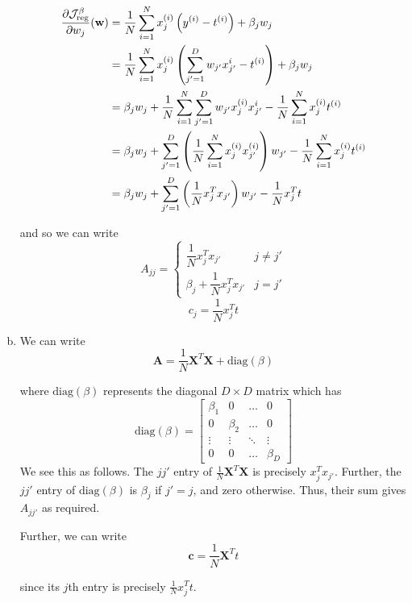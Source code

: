 \documentclass{article}
\begin{document}
\begin{enumerate}[(a)]
    \begin{align*}
        \frac{\partial \mathcal{J}^{\beta}_{\text{reg}}}{\partial w_j}(\mathbf{w}) &= \frac{1}{N} \sum_{i = 1}^N x_j^{(i)} \left(y^{(i)} - t^{(i)}\right) + \beta_j w_j\\
        &= \frac{1}{N} \sum_{i = 1}^N x_j^{(i)} \left(\sum_{j' = 1}^D w_{j'} x_{j'}^{i} - t^{(i)}\right) + \beta_j w_j\\
        &= \beta_j w_j + \frac{1}{N} \sum_{i = 1}^N \sum_{j' = 1}^D w_{j'}  x_j^{(i)} x_{j'}^{i}  -  \frac{1}{N}\sum_{i = 1}^N x_j^{(i)} t^{(i)} \\
        &= \beta_j w_j + \sum_{j' = 1}^D \left(\frac{1}{N} \sum_{i = 1}^N x_j^{(i)}x_{j'}^{(i)} \right) w_{j'} -  \frac{1}{N}\sum_{i = 1}^N x_j^{(i)} t^{(i)} \\
        &= \beta_j w_j + \sum_{j' = 1}^D \left(\frac{1}{N} x_j^T x_{j'} \right) w_{j'} -  \frac{1}{N} x_j^T t \\
    \end{align*}

    and so we can write \[A_{jj} = \begin{cases}
        \dfrac{1}{N} x_j^T x_{j'} & j \neq j'\\
        \beta_j + \dfrac{1}{N} x_j^T x_{j'} & j = j'
    \end{cases}
        \]
        \[c_j = \frac{1}{N} x_j^T t\]

    \newcommand{\diag}{\text{diag}}
    \item We can write \[\mathbf{A} = \frac{1}{N} \mathbf{X}^T \mathbf{X} + \diag(\beta)\]
    
    where $\diag(\beta)$ represents the diagonal $D \times D$ matrix which has \[\diag(\beta) = \begin{bmatrix}
        \beta_1 & 0 & \dots & 0\\
        0 & \beta_2 & \dots & 0\\
        \vdots & \vdots & \ddots & \vdots\\
        0 & 0 & \dots & \beta_D
    \end{bmatrix}
        \]
        We see this as follows. The $jj'$ entry of $\frac{1}{N} \mathbf{X}^T \mathbf{X}$ is precisely $x_j^T x_{j'}$. Further, the $jj'$ entry of $\diag(\beta)$ is $\beta_j$ if $j' = j$, and zero otherwise. Thus, their sum gives $A_{jj'}$ as required.

        Further, we can write \[\mathbf{c} = \frac{1}{N} \mathbf{X}^T t\]

        since its $j$th entry is precisely $\frac{1}{N} x_j^T t$.


\end{enumerate}
\end{document}
